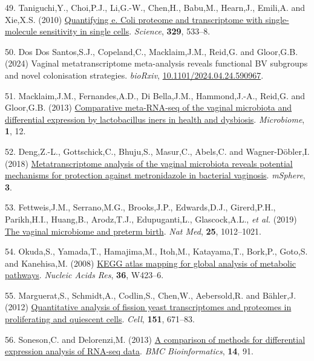 \documentclass[
]{article}
\newlength{\cslhangindent}
\newenvironment{CSLReferences}[2] %
 {\begin{list}{}{%
  \setlength{\itemindent}{0pt}
  \setlength{\leftmargin}{0pt}
  \setlength{\parsep}{0pt}
  \ifodd #1
   \setlength{\leftmargin}{\cslhangindent}
   \setlength{\itemindent}{-1\cslhangindent}
  \fi
  \setlength{\itemsep}{#2\baselineskip}}}
 {\end{list}}
\begin{document}
\begin{CSLReferences}{1}{1}
49. Taniguchi,Y., Choi,P.J., Li,G.-W., Chen,H., Babu,M., Hearn,J.,
Emili,A. and Xie,X.S. (2010)
\href{https://doi.org/10.1126/science.1188308}{Quantifying e. Coli
proteome and transcriptome with single-molecule sensitivity in single
cells}. \emph{Science}, \textbf{329}, 533--8.

50. Dos Dos Santos,S.J., Copeland,C., Macklaim,J.M., Reid,G. and
Gloor,G.B. (2024) Vaginal metatranscriptome meta-analysis reveals
functional BV subgroups and novel colonisation strategies.
\emph{bioRxiv},
\href{https://doi.org/10.1101/2024.04.24.590967}{10.1101/2024.04.24.590967}.

51. Macklaim,J.M., Fernandes,A.D., Di Bella,J.M., Hammond,J.-A., Reid,G.
and Gloor,G.B. (2013)
\href{https://doi.org/10.1186/2049-2618-1-12}{Comparative meta-{RNA}-seq
of the vaginal microbiota and differential expression by lactobacillus
iners in health and dysbiosis}. \emph{Microbiome}, \textbf{1}, 12.

52. Deng,Z.-L., Gottschick,C., Bhuju,S., Masur,C., Abels,C. and
Wagner-Döbler,I. (2018)
\href{https://doi.org/10.1128/mSphereDirect.00262-18}{Metatranscriptome
analysis of the vaginal microbiota reveals potential mechanisms for
protection against metronidazole in bacterial vaginosis}.
\emph{mSphere}, \textbf{3}.

53. Fettweis,J.M., Serrano,M.G., Brooks,J.P., Edwards,D.J., Girerd,P.H.,
Parikh,H.I., Huang,B., Arodz,T.J., Edupuganti,L., Glascock,A.L.,
\emph{et al.} (2019)
\href{https://doi.org/10.1038/s41591-019-0450-2}{The vaginal microbiome
and preterm birth}. \emph{Nat Med}, \textbf{25}, 1012--1021.

54. Okuda,S., Yamada,T., Hamajima,M., Itoh,M., Katayama,T., Bork,P.,
Goto,S. and Kanehisa,M. (2008)
\href{https://doi.org/10.1093/nar/gkn282}{KEGG atlas mapping for global
analysis of metabolic pathways}. \emph{Nucleic Acids Res}, \textbf{36},
W423--6.

55. Marguerat,S., Schmidt,A., Codlin,S., Chen,W., Aebersold,R. and
Bähler,J. (2012)
\href{https://doi.org/10.1016/j.cell.2012.09.019}{Quantitative analysis
of fission yeast transcriptomes and proteomes in proliferating and
quiescent cells}. \emph{Cell}, \textbf{151}, 671--83.

56. Soneson,C. and Delorenzi,M. (2013)
\href{https://doi.org/10.1186/1471-2105-14-91}{A comparison of methods
for differential expression analysis of {RNA-seq} data}. \emph{BMC
Bioinformatics}, \textbf{14}, 91.


\end{CSLReferences}
\end{document}

